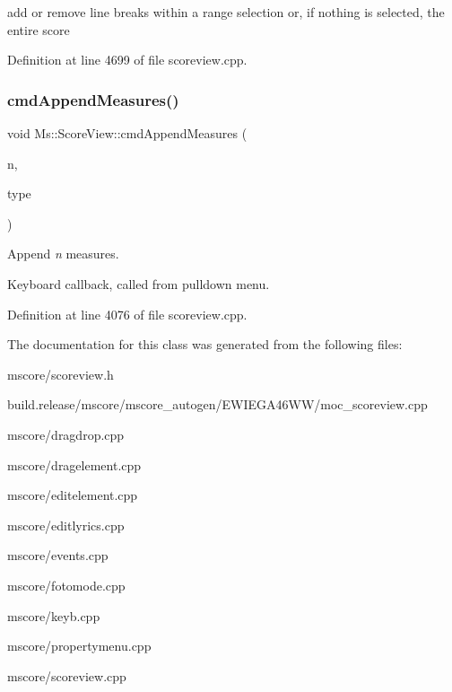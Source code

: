 add or remove line breaks within a range selection or, if nothing is selected, the entire score 

Definition at line 4699 of file scoreview.\+cpp.

\mbox{\label{class_ms_1_1_score_view_a336033b7ff252caa99dca592b20805de}} 
\subsubsection{\texorpdfstring{cmd\+Append\+Measures()}{cmdAppendMeasures()}}
{\footnotesize\ttfamily void Ms\+::\+Score\+View\+::cmd\+Append\+Measures (\begin{DoxyParamCaption}\item[{int}]{n,  }\item[{Element\+Type}]{type }\end{DoxyParamCaption})}

Append {\itshape n} measures.

Keyboard callback, called from pulldown menu. 

Definition at line 4076 of file scoreview.\+cpp.



The documentation for this class was generated from the following files\+:\begin{DoxyCompactItemize}
\item 
mscore/scoreview.\+h\item 
build.\+release/mscore/mscore\+\_\+autogen/\+E\+W\+I\+E\+G\+A46\+W\+W/moc\+\_\+scoreview.\+cpp\item 
mscore/dragdrop.\+cpp\item 
mscore/dragelement.\+cpp\item 
mscore/editelement.\+cpp\item 
mscore/editlyrics.\+cpp\item 
mscore/events.\+cpp\item 
mscore/fotomode.\+cpp\item 
mscore/keyb.\+cpp\item 
mscore/propertymenu.\+cpp\item 
mscore/scoreview.\+cpp\end{DoxyCompactItemize}

